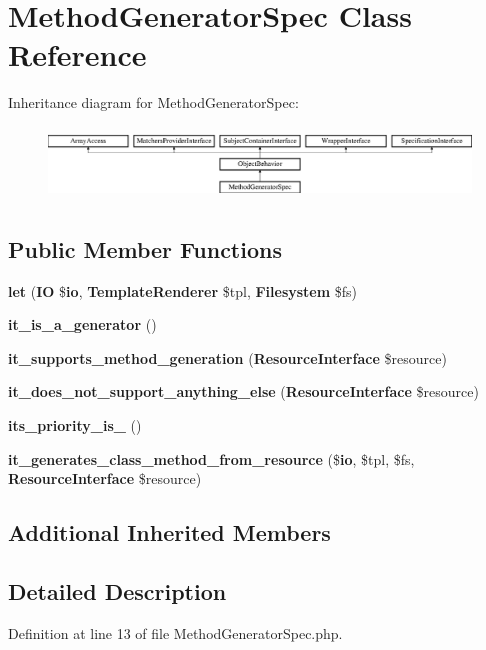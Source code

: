 \section{Method\+Generator\+Spec Class Reference}
\label{classspec_1_1_php_spec_1_1_code_generator_1_1_generator_1_1_method_generator_spec}
Inheritance diagram for Method\+Generator\+Spec\+:\begin{figure}[H]
\begin{center}
\leavevmode
\includegraphics[height=1.953488cm]{classspec_1_1_php_spec_1_1_code_generator_1_1_generator_1_1_method_generator_spec}
\end{center}
\end{figure}
\subsection*{Public Member Functions}
\begin{DoxyCompactItemize}
\item 
{\bf let} ({\bf I\+O} \${\bf io}, {\bf Template\+Renderer} \$tpl, {\bf Filesystem} \$fs)
\item 
{\bf it\+\_\+is\+\_\+a\+\_\+generator} ()
\item 
{\bf it\+\_\+supports\+\_\+method\+\_\+generation} ({\bf Resource\+Interface} \$resource)
\item 
{\bf it\+\_\+does\+\_\+not\+\_\+support\+\_\+anything\+\_\+else} ({\bf Resource\+Interface} \$resource)
\item 
{\bf its\+\_\+priority\+\_\+is\+\_} ()
\item 
{\bf it\+\_\+generates\+\_\+class\+\_\+method\+\_\+from\+\_\+resource} (\${\bf io}, \$tpl, \$fs, {\bf Resource\+Interface} \$resource)
\end{DoxyCompactItemize}
\subsection*{Additional Inherited Members}


\subsection{Detailed Description}


Definition at line 13 of file Method\+Generator\+Spec.\+php.



